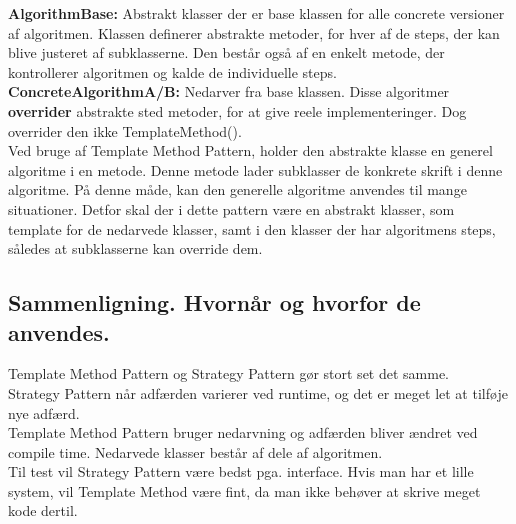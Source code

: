 \documentclass[../report.tex]{subfiles}
\begin{document}
\textbf{AlgorithmBase:} Abstrakt klasser der er base klassen for alle concrete versioner af algoritmen. Klassen definerer abstrakte metoder, for hver af de steps, der kan blive justeret af subklasserne. Den består også af en enkelt metode, der kontrollerer algoritmen og kalde de individuelle steps.
\\

\textbf{ConcreteAlgorithmA/B:} Nedarver fra base klassen. Disse algoritmer \textbf{overrider} abstrakte sted metoder, for at give reele implementeringer. Dog overrider den ikke TemplateMethod().
\\

Ved bruge af Template Method Pattern, holder den abstrakte klasse en generel algoritme i en metode. Denne metode lader subklasser de konkrete skrift i denne algoritme. På denne måde, kan den generelle algoritme anvendes til mange situationer. Detfor skal der i dette pattern være en abstrakt klasser, som template for de nedarvede klasser, samt i den klasser der har algoritmens steps, således at subklasserne kan override dem.

\subsection*{Sammenligning. Hvornår og hvorfor de anvendes.}
Template Method Pattern og Strategy Pattern gør stort set det samme.
\\

Strategy Pattern når adfærden varierer ved runtime, og det er meget let at tilføje nye adfærd.
\\

Template Method Pattern bruger nedarvning og adfærden bliver ændret ved compile time. Nedarvede klasser består af dele af algoritmen.
\\

Til test vil Strategy Pattern være bedst pga. interface. Hvis man har et lille system, vil Template Method være fint, da man ikke behøver at skrive meget kode dertil.
\end{document}
